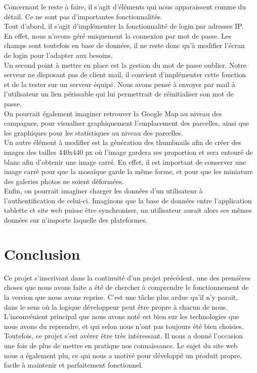 \documentclass[twoside]{EPURapport}
\begin{document}
	Concernant le reste à faire, il s'agit d'éléments qui nous apparaissent comme du détail. Ce ne sont pas d'importantes fonctionnalités.\\
	
	Tout d'abord, il s'agit d'implémenter la fonctionnalité de login par adresses IP. En effet, nous n'avons géré uniquement la connexion par mot de passe. Les champs sont toutefois en base de données, il ne reste donc qu'à modifier l'écran de login pour l'adapter aux besoins.\\
	
	Un second point à mettre en place est la gestion du mot de passe oublier. Notre serveur ne disposant pas de client mail, il convient d'implémenter cette fonction et de la tester sur un serveur équipé. Nous avons pensé à envoyer par mail à l'utilisateur un lien périssable qui lui permettrait de réinitialiser son mot de passe.\\
	
	On pourrait également imaginer retrouver la Google Map au niveau des campagnes, pour visualiser graphiquement l'emplacement des parcelles, ainsi que les graphiques pour les statistiques au niveau des parcelles.\\
	
	Un autre élément à modifier est la génération des thumbnails afin de créer des images des tailles 440x440 px où l'image gardera ses proportion et sera entouré de blanc afin d'obtenir une image carré. En effet, il est important de conserver une image carré pour que la mosaïque garde la même forme, et pour que les miniature des galeries photos ne soient déformées.\\
	
	Enfin, on pourrait imaginer charger les données d'un utilisateur à l'authentification de celui-ci. Imaginons que la base de données entre l'application tablette et site web puisse être synchroniser, un utilisateur aurait alors ses mêmes données sur n'importe laquelle des plateformes.

\chapter{Conclusion}

Ce projet s'inscrivant dans la continuité d'un projet précédent, une des premières choses que nous avons faite a été de chercher à comprendre le fonctionnement de la version que nous avons reprise. C'est une tâche plus ardue qu'il n'y parait, dans le sens où la logique développeur peut être propre à chacun de nous. L'inconvénient principal que nous avons noté est bien sur les technologies que nous avons du reprendre, et qui selon nous n'ont pas toujours été bien choisies.\\

Toutefois, ce projet s'est avérer être très intéressant. Il nous a donné l'occasion une fois de plus de mettre en pratique nos connaissance. Le sujet du site web nous a également plu, ce qui nous a motivé pour développé un produit propre, facile à maintenir et parfaitement fonctionnel.

\annexes
\end{document}

